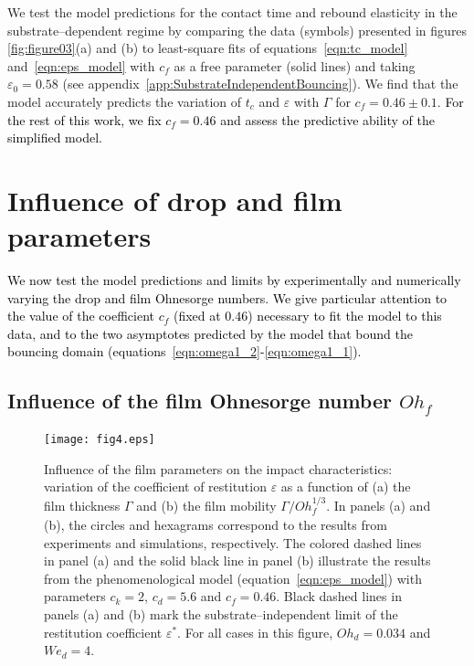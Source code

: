 \documentclass[]{jfm}
\newcommand{\revRev}[1]{\textcolor{black}{#1}}
\newcommand{\Ohd}{\mathit{Oh}_\mathit{d}}
\newcommand{\Ohf}{\mathit{Oh}_\mathit{f}}
\newcommand{\Wen}{\mathit{We}_\mathit{d}}
\begin{document}
	We test the model predictions for the contact time and rebound elasticity in the substrate--dependent regime by comparing the data (symbols) presented in figures \ref{fig:figure03}(a) and (b) to least-square fits of equations~\eqref{eqn:tc_model} and~\eqref{eqn:eps_model} with $c_f$ as a free parameter (solid lines) and taking $\varepsilon_0 = 0.58$ (see appendix~\ref{app:SubstrateIndependentBouncing}). We find that the model accurately predicts the variation of $t_c$ and $\varepsilon$ with $\Gamma$ for $c_f = 0.46 \pm 0.1$. \revRev{For the rest of this work, we fix $c_f = 0.46$ and assess the predictive ability of the simplified model.}
	
	
	\section{Influence of drop and film parameters}\label{sec:influence}
	
	\revRev{We now test the model predictions and limits by experimentally and numerically varying the drop and film Ohnesorge numbers. We give particular attention to the value of the coefficient $c_f$ (fixed at $0.46$) necessary to fit the model to this data, and to the two asymptotes predicted by the model that bound the bouncing domain (equations~\eqref{eqn:omega1_2}-\eqref{eqn:omega1_1}).}
	
	\subsection{Influence of the film Ohnesorge number $\Ohf$}
	
	\begin{figure}
		\centering
		\texttt{[image: fig4.eps]}
		\caption{Influence of the film parameters on the impact characteristics: variation of the coefficient of restitution $\varepsilon$ as a function of (a) the film thickness $\Gamma$ and (b) the film mobility $\Gamma / \Ohf^{1/3}$. In panels (a) and (b), the circles and hexagrams correspond to the results from experiments and simulations, respectively. The colored dashed lines in panel (a) and the solid black line in panel (b) illustrate the results from the phenomenological model (equation~\eqref{eqn:eps_model}) with parameters $c_{k} = 2$, $c_{d} = 5.6$ and $c_{f} = 0.46$. Black dashed lines in panels (a) and (b) mark the substrate--independent limit of the restitution coefficient $\varepsilon^*$. For all cases in this figure, $\Ohd = 0.034$ and $\Wen = 4$.}
		\label{fig:controlParameters1}
	\end{figure}
	
\end{document}

